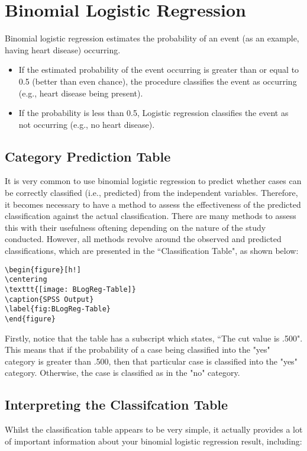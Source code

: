 \documentclass[12pt]{article}
\begin{document}
\section{Binomial Logistic Regression}
Binomial logistic regression estimates the probability of an event (as an example, having heart disease) occurring. 
\begin{itemize}
\item If the estimated probability of the event occurring is greater than or equal to 0.5 (better than even chance), the procedure classifies the event as occurring (e.g., heart disease being present). \item If the probability is less than 0.5, Logistic regression classifies the event as not occurring (e.g., no heart disease). 
\end{itemize}
\subsection{Category Prediction Table}




It is very common to use binomial logistic regression to predict whether cases can be correctly classified (i.e., predicted) from the independent variables. Therefore, it becomes necessary to have a method to assess the effectiveness of the predicted classification against the actual classification. There are many methods to assess this with their usefulness oftening depending on the nature of the study conducted. However, all methods revolve around the observed and predicted classifications, which are presented in the ``Classification Table", as shown below:

\begin{verbatim}
\begin{figure}[h!]
\centering
\texttt{[image: BLogReg-Table]}
\caption{SPSS Output}
\label{fig:BLogReg-Table}
\end{figure}
\end{verbatim}

Firstly, notice that the table has a subscript which states, ``The cut value is .500". This means that if the probability of a case being classified into the "yes" category is greater than .500, then that particular case is classified into the "yes" category. 
Otherwise, the case is classified as in the "no" category. 

\subsection{Interpreting the Classifcation Table}
Whilst the classification table appears to be very simple, it actually provides a lot of important information about your binomial logistic regression result, including:
\end{document}
